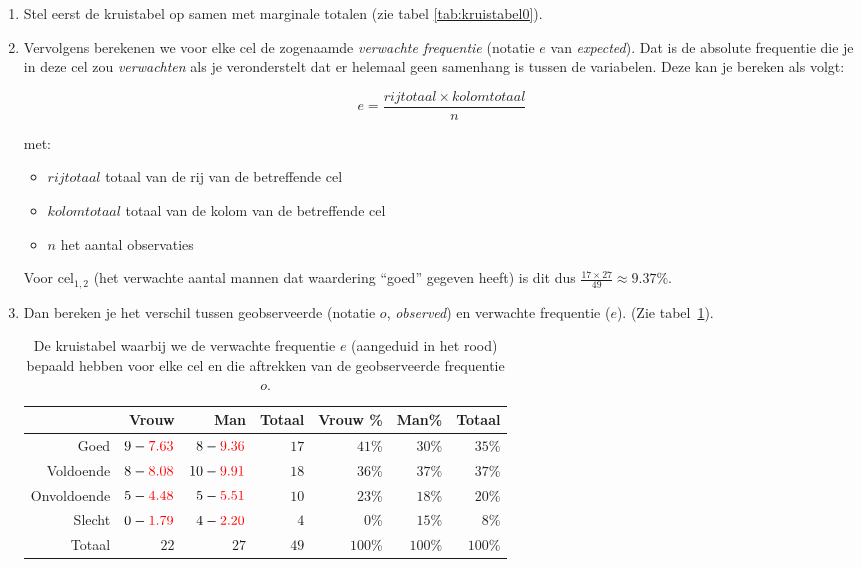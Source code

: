 \begin{enumerate}
  \item Stel eerst de kruistabel op samen met marginale totalen (zie tabel \ref{tab:kruistabel0}).
  \item Vervolgens berekenen we voor elke cel de zogenaamde \emph{verwachte frequentie} (notatie $e$ van \emph{expected}). Dat is de absolute frequentie die je in deze cel zou \emph{verwachten} als je veronderstelt dat er helemaal geen samenhang is tussen de variabelen. Deze kan je bereken als volgt:
  
  \begin{equation}
  e = \frac{rijtotaal \times kolomtotaal}{n}
  \end{equation}
  
  met:
  
  \begin{itemize}
    \item $rijtotaal$ totaal van de rij van de betreffende cel
    \item $kolomtotaal$ totaal van de kolom van de betreffende cel
    \item $n$ het aantal observaties
  \end{itemize}
  
  Voor cel$_{1,2}$ (het verwachte aantal mannen dat waardering ``goed'' gegeven heeft) is dit dus $\frac{17 \times 27}{49} \approx 9.37\%$.
  
  \item Dan bereken je het verschil tussen geobserveerde (notatie $o$, \emph{observed}) en verwachte frequentie ($e$). (Zie tabel~\ref{tab:kruistabel2}).
  
  \begin{table} \centering
    \begin{tabular}{@{}rrrrrrr@{}}
    	\toprule
    	            &                       Vrouw &                          Man & Totaal & Vrouw \% &   Man\% &  Totaal \\
    	\midrule
    	       Goed &  $9 -\textcolor{red}{7.63}$ &  $8 - \textcolor{red}{9.36}$ &   $17$ &   $41$\% &  $30$\% &  $35$\% \\
    	  Voldoende & $8 - \textcolor{red}{8.08}$ & $10 - \textcolor{red}{9.91}$ &   $18$ &   $36$\% &  $37$\% &  $37$\% \\
    	Onvoldoende & $5 - \textcolor{red}{4.48}$ &  $5 - \textcolor{red}{5.51}$ &   $10$ &   $23$\% &  $18$\% &  $20$\% \\
    	     Slecht & $0 - \textcolor{red}{1.79}$ &  $4 - \textcolor{red}{2.20}$ &    $4$ &    $0$\% &  $15$\% &   $8$\% \\
    	     Totaal &                        $22$ &                         $27$ &   $49$ &  $100$\% & $100$\% & $100$\% \\
    	\bottomrule
    \end{tabular}
    \caption{De kruistabel waarbij we de verwachte frequentie $e$ (aangeduid in het rood) bepaald hebben voor elke cel en die aftrekken van de geobserveerde frequentie $o$.}
    \label{tab:kruistabel2}
  \end{table}
  

\end{enumerate}
